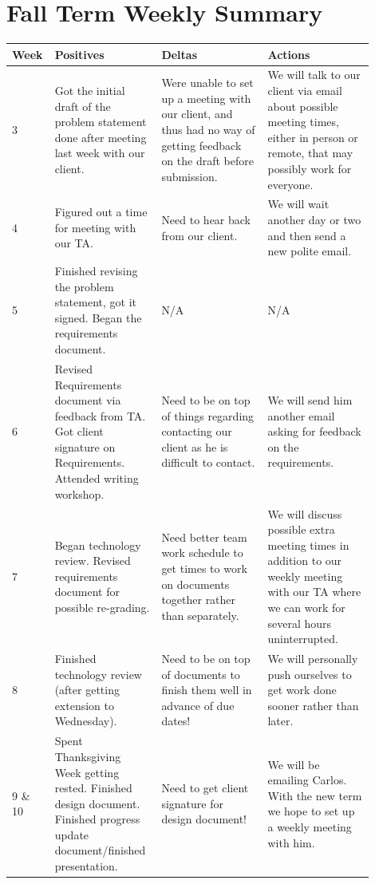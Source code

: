 \documentclass[onecolumn, draftclsnofoot,10pt, compsoc]{IEEEtran}
\begin{document}
\section{Fall Term Weekly Summary}

\begin{tabular}{|p{0.05\linewidth}|p{0.285\linewidth}|p{0.285\linewidth}|p{0.285\linewidth}|}
\hline
Week & Positives & Deltas & Actions \\ \hline

	3
	& Got the initial draft of the problem statement done after meeting last
	week with our client.
	& Were unable to set up a meeting with our client, and thus had no way of
	getting feedback on the draft before submission.
	& We will talk to our client via email about possible meeting times, either
	in person or remote, that may possibly work for everyone. \\ \hline

	4
	& Figured out a time for meeting with our TA.
	& Need to hear back from our client.
	& We will wait another day or two and then send a new polite email. \\ \hline

	5
	& Finished revising the problem statement, got it signed.
		Began the requirements document.
	& N/A
	& N/A\\ \hline

	6
	& Revised Requirements document via feedback from TA. Got client signature on Requirements.
		Attended writing workshop.
	& Need to be on top of things regarding contacting our client as
		he is difficult to contact.
	& We will send him another email asking for feedback on the requirements. \\ \hline

	7
	& Began technology review. Revised requirements document for possible re-grading.
	& Need better team work schedule to get times to work on documents
	together rather than separately.
	& We will discuss possible extra meeting times in addition to our weekly meeting
	with our TA where we can work for several hours uninterrupted. \\ \hline

	8
	& Finished technology review (after getting extension to Wednesday).
	& Need to be on top of documents to finish them well in advance of due dates!
	& We will personally push ourselves to get work done sooner rather than later. \\ \hline


	9 \hspace{3mm} \& 10
	& Spent Thanksgiving Week getting rested. Finished design document.
		Finished progress update document/finished presentation.
	& Need to get client signature for design document!
	& We will be emailing Carlos. With the new term we hope
		to set up a weekly meeting with him.  \\ \hline

\end{tabular}
\end{document}
